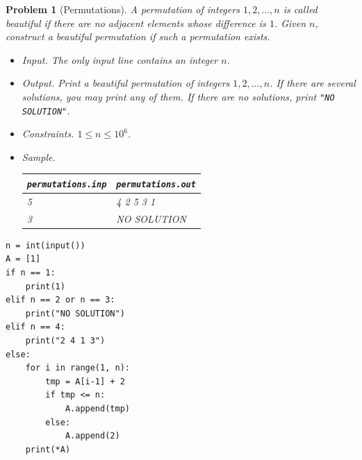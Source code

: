 \documentclass{article}
\newtheorem{problem}{Problem}
\begin{document}
\begin{problem}[Permutations]
	A permutation of integers $1,2,\ldots,n$ is called \emph{beautiful} if there are no adjacent elements whose difference is $1$. Given $n$, construct a beautiful permutation if such a permutation exists.
	\begin{itemize}
		\item {\sf Input.} The only input line contains an integer $n$.
		\item {\sf Output.} Print a beautiful permutation of integers $1,2,\ldots,n$. If there are several solutions, you may print any of them. If there are no solutions, print \verb|"NO SOLUTION"|.
		\item {\sf Constraints.} $1\le n\le10^6$.
		\item {\sf Sample.}
		\begin{table}[H]
			\centering
			\begin{tabular}{|l|l|}
				\hline
				\verb|permutations.inp| & \verb|permutations.out| \\
				\hline
				5 & 4 2 5 3 1 \\
				\hline
				3 & NO SOLUTION \\
				\hline
			\end{tabular}
		\end{table}
	\end{itemize}
\end{problem}

\begin{verbatim}
n = int(input())
A = [1]
if n == 1:
    print(1)
elif n == 2 or n == 3:
    print("NO SOLUTION")
elif n == 4:
    print("2 4 1 3")
else:
    for i in range(1, n):
        tmp = A[i-1] + 2
        if tmp <= n:
            A.append(tmp)
        else:
            A.append(2)
    print(*A)
\end{verbatim}
\end{document}
